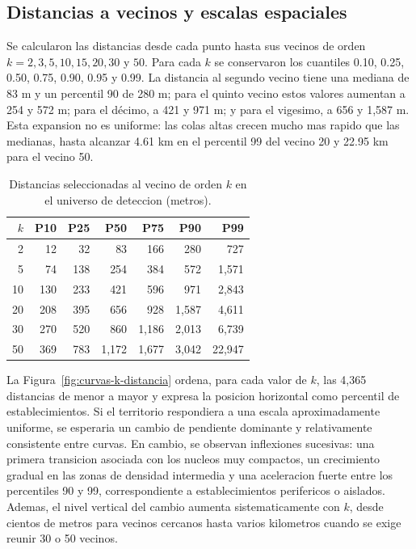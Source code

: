\documentclass[11pt,letterpaper]{article}
\begin{document}
\subsection{Distancias a vecinos y escalas espaciales}

Se calcularon las distancias desde cada punto hasta sus vecinos de orden $k=2,3,5,10,15,20,30$ y $50$. Para cada $k$ se conservaron los cuantiles 0.10, 0.25, 0.50, 0.75, 0.90, 0.95 y 0.99. La distancia al segundo vecino tiene una mediana de 83 m y un percentil 90 de 280 m; para el quinto vecino estos valores aumentan a 254 y 572 m; para el décimo, a 421 y 971 m; y para el vigesimo, a 656 y 1,587 m. Esta expansion no es uniforme: las colas altas crecen mucho mas rapido que las medianas, hasta alcanzar 4.61 km en el percentil 99 del vecino 20 y 22.95 km para el vecino 50.

\begin{table}[H]
\centering
\small
\caption{Distancias seleccionadas al vecino de orden $k$ en el universo de deteccion (metros).}
\begin{tabular}{rrrrrrr}
\toprule
$k$ & P10 & P25 & P50 & P75 & P90 & P99 \\
\midrule
2  & 12  & 32  & 83   & 166  & 280   & 727 \\
5  & 74  & 138 & 254  & 384  & 572   & 1,571 \\
10 & 130 & 233 & 421  & 596  & 971   & 2,843 \\
20 & 208 & 395 & 656  & 928  & 1,587 & 4,611 \\
30 & 270 & 520 & 860  & 1,186 & 2,013 & 6,739 \\
50 & 369 & 783 & 1,172 & 1,677 & 3,042 & 22,947 \\
\bottomrule
\end{tabular}
\end{table}

La Figura~\ref{fig:curvas-k-distancia} ordena, para cada valor de $k$, las 4,365 distancias de menor a mayor y expresa la posicion horizontal como percentil de establecimientos. Si el territorio respondiera a una escala aproximadamente uniforme, se esperaria un cambio de pendiente dominante y relativamente consistente entre curvas. En cambio, se observan inflexiones sucesivas: una primera transicion asociada con los nucleos muy compactos, un crecimiento gradual en las zonas de densidad intermedia y una aceleracion fuerte entre los percentiles 90 y 99, correspondiente a establecimientos perifericos o aislados. Ademas, el nivel vertical del cambio aumenta sistematicamente con $k$, desde cientos de metros para vecinos cercanos hasta varios kilometros cuando se exige reunir 30 o 50 vecinos.
\end{document}
